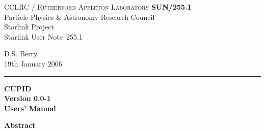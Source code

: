 \documentclass[twoside,11pt]{article}
\newcommand{\stardoccategory}  {Starlink User Note}
\newcommand{\stardocinitials}  {SUN}
\newcommand{\stardocnumber}    {255.1}
\newcommand{\stardocauthors}   {D.S. Berry}
\newcommand{\stardocdate}      {19th January 2006}
\newcommand{\stardoctitle}     {CUPID}
\newcommand{\stardocversion}   {Version 0.0-1}
\newcommand{\stardocmanual}    {Users' Manual}
\newcommand{\stardocname}{\stardocinitials /\stardocnumber}
\newenvironment{latexonly}{}{}
\renewcommand{\_}{\texttt{\symbol{95}}}
\begin{document}
\thispagestyle{empty}

\begin{latexonly}
   CCLRC / \textsc{Rutherford Appleton Laboratory} \hfill \textbf{\stardocname}\\
   {\large Particle Physics \& Astronomy Research Council}\\
   {\large Starlink Project\\}
   {\large \stardoccategory\ \stardocnumber}
   \begin{flushright}
   \stardocauthors\\
   \stardocdate
   \end{flushright}
   \vspace{-4mm}
   \rule{\textwidth}{0.5mm}
   \vspace{5mm}
   \begin{center}
   {\Huge\textbf{\stardoctitle \\ [2.5ex]}}
   {\LARGE\textbf{\stardocversion \\ [4ex]}}
   {\Huge\textbf{\stardocmanual}}
   \end{center}
   \vspace{5mm}


   \vspace{5mm}
   \begin{center}
      {\Large\textbf{Abstract}}
   \end{center}
\end{latexonly}
\end{document}
